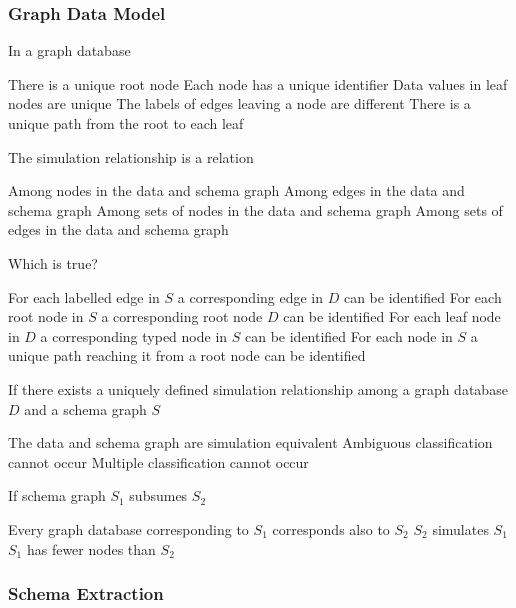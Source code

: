 \documentclass[12pt,a4paper,answers]{exam} %
\begin{document}
\begin{flushleft}
\begin{multicols*}{2}
\begin{questions}
\subsubsection{Graph Data Model}
\question In a graph database
\begin{checkboxes}
\choice There is a unique root node
\CorrectChoice Each node has a unique identifier
\choice Data values in leaf nodes are unique
\choice The labels of edges leaving a node are different
\choice There is a unique path from the root to each leaf
\end{checkboxes}

\question The simulation relationship is a relation
\begin{checkboxes}
\CorrectChoice Among nodes in the data and schema graph
\choice Among edges in the data and schema graph
\choice Among sets of nodes in the data and schema graph
\choice Among sets of edges in the data and schema graph
\end{checkboxes}

\question Which is true?
\begin{checkboxes}
\choice For each labelled edge in $S$ a corresponding edge in $D$ can be identified
\choice For each root node in $S$ a corresponding root node $D$ can be identified
\CorrectChoice For each leaf node in $D$ a corresponding typed node in $S$ can be identified
\choice For each node in $S$ a unique path reaching it from a root node can be identified
\end{checkboxes}

\question If there exists a uniquely defined simulation relationship among a graph database $D$ and a schema graph $S$
\begin{checkboxes}
\choice The data and schema graph are simulation equivalent
\CorrectChoice Ambiguous classification cannot occur
\choice Multiple classification cannot occur
\end{checkboxes}

\question If schema graph $S_1$ subsumes $S_2$
\begin{checkboxes}
\choice Every graph database corresponding to $S_1$ corresponds also to $S_2$
\CorrectChoice $S_2$ simulates $S_1$
\choice $S_1$ has fewer nodes than $S_2$
\end{checkboxes}

\subsubsection{Schema Extraction}


\end{questions}
\end{multicols*}
\end{flushleft}
\end{document}
